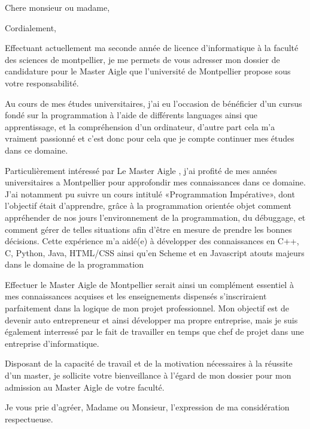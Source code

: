 \documentclass[11pt,a4paper,sans]{moderncv}
\begin{document}
\date{8 Janvier 2017}
\opening{Chere monsieur ou madame,}
\closing{Cordialement,}       
\makelettertitle

Effectuant actuellement ma seconde année de licence d'informatique à la faculté des sciences de montpellier, je me permets de vous adresser mon dossier de candidature pour le Master Aigle que l’université de Montpellier propose sous votre responsabilité.

Au cours de mes études universitaires, j’ai eu l’occasion de bénéficier d’un cursus fondé sur la programmation à l'aide de différents languages ainsi que apprentissage, et la compréhension d'un ordinateur, d’autre part cela m'a vraiment passionné et c'est donc pour cela que je compte continuer mes études dans ce domaine.

Particulièrement intéressé par Le Master Aigle , j’ai profité de mes années universitaires a Montpellier pour approfondir mes connaissances dans ce domaine. J’ai notamment pu suivre un cours intitulé «Programmation Impérative», dont l’objectif était d’apprendre, grâce à la programmation orientée objet  comment appréhender de nos jours l'environnement de la programmation, du débuggage, et comment gérer de telles situations afin d’être en mesure de prendre les bonnes décisions. Cette expérience m’a aidé(e) à développer des connaissances en C++, C, Python, Java, HTML/CSS ainsi qu'en Scheme et en Javascript atouts majeurs dans le domaine de la programmation

Effectuer le Master Aigle de Montpellier serait ainsi un complément essentiel à mes connaissances acquises et les enseignements dispensés s’inscriraient parfaitement dans la logique de mon projet professionnel. Mon objectif est de devenir auto entrepreneur et ainsi développer ma propre entreprise, mais je suis également interressé par le fait de travailler en temps que chef de projet dans une entreprise d'informatique.

Disposant de la capacité de travail et de la motivation nécessaires à la réussite d’un master, je sollicite votre bienveillance à l’égard de mon dossier pour mon admission au Master Aigle de votre faculté.

Je vous prie d’agréer, Madame ou Monsieur, l’expression de ma considération respectueuse.
\makeletterclosing
\end{document}
